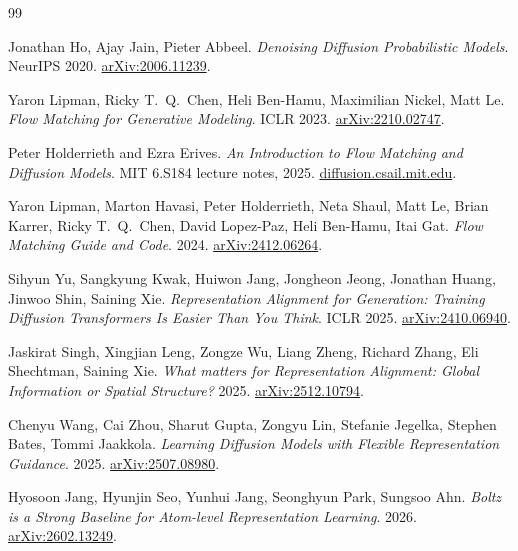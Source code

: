 \documentclass[12pt,a4paper,twoside]{report}
\begin{document}
\clearpage
{}
{}
\begin{thebibliography}{99}


Jonathan Ho, Ajay Jain, Pieter Abbeel.
\textit{Denoising Diffusion Probabilistic Models}. NeurIPS 2020.
\href{https://arxiv.org/abs/2006.11239}{arXiv:2006.11239}.

Yaron Lipman, Ricky T.~Q.~Chen, Heli Ben-Hamu, Maximilian Nickel, Matt Le.
\textit{Flow Matching for Generative Modeling}. ICLR 2023.
\href{https://arxiv.org/abs/2210.02747}{arXiv:2210.02747}.

Peter Holderrieth and Ezra Erives.
\textit{An Introduction to Flow Matching and Diffusion Models}.
MIT 6.S184 lecture notes, 2025.
\href{https://diffusion.csail.mit.edu/}{diffusion.csail.mit.edu}.

Yaron Lipman, Marton Havasi, Peter Holderrieth, Neta Shaul, Matt Le, Brian Karrer, Ricky T.~Q.~Chen, David Lopez-Paz, Heli Ben-Hamu, Itai Gat.
\textit{Flow Matching Guide and Code}. 2024.
\href{https://arxiv.org/abs/2412.06264}{arXiv:2412.06264}.


Sihyun Yu, Sangkyung Kwak, Huiwon Jang, Jongheon Jeong, Jonathan Huang, Jinwoo Shin, Saining Xie.
\textit{Representation Alignment for Generation: Training Diffusion Transformers Is Easier Than You Think}. ICLR 2025.
\href{https://arxiv.org/abs/2410.06940}{arXiv:2410.06940}.

Jaskirat Singh, Xingjian Leng, Zongze Wu, Liang Zheng, Richard Zhang, Eli Shechtman, Saining Xie.
\textit{What matters for Representation Alignment: Global Information or Spatial Structure?} 2025.
\href{https://arxiv.org/abs/2512.10794}{arXiv:2512.10794}.

Chenyu Wang, Cai Zhou, Sharut Gupta, Zongyu Lin, Stefanie Jegelka, Stephen Bates, Tommi Jaakkola.
\textit{Learning Diffusion Models with Flexible Representation Guidance}. 2025.
\href{https://arxiv.org/abs/2507.08980}{arXiv:2507.08980}.

Hyosoon Jang, Hyunjin Seo, Yunhui Jang, Seonghyun Park, Sungsoo Ahn.
\textit{Boltz is a Strong Baseline for Atom-level Representation Learning}. 2026.
\href{https://arxiv.org/abs/2602.13249}{arXiv:2602.13249}.


\end{thebibliography}
\end{document}
